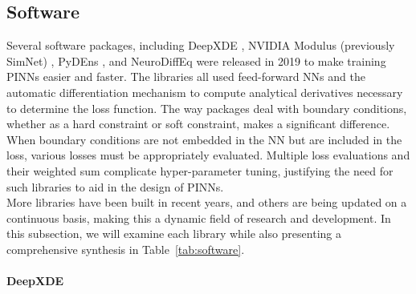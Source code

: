 \documentclass[pdflatex,sn-basic]{sn-jnl}%
\theoremstyle{thmstyleone}%
\theoremstyle{thmstyletwo}%
\theoremstyle{thmstylethree}%
\begin{document}









\subsection{Software} %

Several software packages, including DeepXDE \citep{lu2021deepxde}, NVIDIA Modulus (previously SimNet) \citep{Hen2021_NvidiaSimnetAi_NarHNN}, PyDEns  \citep{Kor2019_PydensPythonFramework_KhuKKT}, and NeuroDiffEq  \citep{chen2020neurodiffeq} were released in 2019 to make training PINNs easier and faster. 
The libraries all used feed-forward NNs and the automatic differentiation mechanism to compute analytical derivatives necessary to determine the loss function. 
The way packages deal with boundary conditions, whether as a hard constraint or soft constraint, makes a significant difference.
%
When boundary conditions are not embedded in the NN but are included in the loss, various losses must be appropriately evaluated.
Multiple loss evaluations and their weighted sum complicate hyper-parameter tuning, justifying the need for such libraries to aid in the design of PINNs. %
\\

More libraries have been built in recent years, and others are being updated on a continuous basis, making this a dynamic field of research and development. 
In this subsection, we will examine each library while also presenting a comprehensive synthesis in
Table~\ref{tab:software}.



\paragraph{DeepXDE} %
\end{document}
